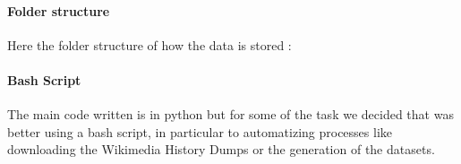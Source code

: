 \paragraph*{Folder structure}
Here the folder structure of how the data is stored :  


\paragraph*{Bash Script}
The main code written is in python but for some of the task we decided that was better using a bash
script, in particular to automatizing processes like downloading the Wikimedia History Dumps or the
generation of the datasets.





